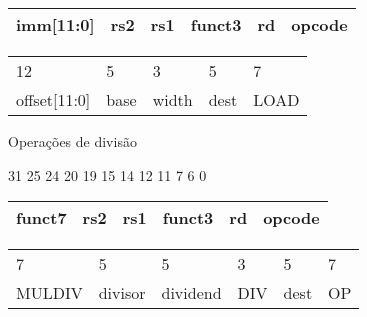 \begin{frame}
{\begin{center}
                \begin{tabular}{ | p{2cm} | p{1cm} | p{2cm} | p{2cm} | p{2cm} | p{2cm} | }
                    \hline
                    imm[11:0] & rs2 & rs1 & funct3 & rd & opcode \\
                    \hline
                \end{tabular}
                \begin{tabular}{p{3cm} p{2cm} p{2cm} p{2cm} p{2cm}}
                12 & 5 & 3 & 5 & 7 \\ 
                offset[11:0] & base & width & dest & LOAD    
                \end{tabular}

            \end{center}

        }

    \end{frame}

    \begin{frame}{Operações de divisão}

        \begin{center}

            \begin{flushleft}
                \footnotesize
                31 \hspace{1.72cm} 25 24 \hspace{0.55cm} 20 19 \hspace{1.48cm} 15 14 \hspace{1.52cm} 12 11 \hspace{1.70cm} 7 6 \hspace{2cm} 0
                \normalsize
            \end{flushleft}

            \begin{tabular}{ | p{2cm} | p{1cm} | p{2cm} | p{2cm} | p{2cm} | p{2cm} | }
                \hline
                funct7 & rs2 & rs1 & funct3 & rd & opcode \\
                \hline
            \end{tabular}
            \begin{tabular}{ p{2cm} p{1cm} p{2cm} p{2cm} p{2cm} p{2cm}}
            7 & 5 & 5 & 3 & 5 & 7 \\ 
            MULDIV & divisor & dividend & DIV & dest & OP 
            \end{tabular}

        \end{center}

    \end{frame}

